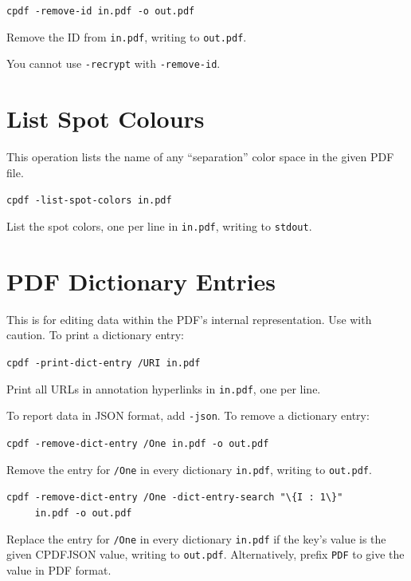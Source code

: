 \documentclass{book}
\begin{document}
  \begin{framed}
  \small\noindent\verb!cpdf -remove-id in.pdf -o out.pdf!

  \vspace{2.5mm}
  \noindent Remove the ID from \texttt{in.pdf}, writing to \texttt{out.pdf}.
  \end{framed}

\noindent You cannot use \texttt{-recrypt} with \texttt{-remove-id}.

\section{List Spot Colours}
This operation lists the name of any ``separation'' color space in the given PDF file.

  \begin{framed}
  \small\noindent\verb!cpdf -list-spot-colors in.pdf!

  \vspace{2.5mm}
  \noindent List the spot colors, one per line in \texttt{in.pdf}, writing to \texttt{stdout}.
  \end{framed}

\section{PDF Dictionary Entries}
\label{removedictentry}
This is for editing data within the PDF's internal representation. Use with caution.
To print a dictionary entry:

  \begin{framed}
  \small\noindent\verb!cpdf -print-dict-entry /URI in.pdf!

  \vspace{2.5mm}
  \noindent Print all URLs in annotation hyperlinks in \texttt{in.pdf}, one per line. 
  \end{framed}

\noindent To report data in JSON format, add \texttt{-json}. To remove a dictionary entry:

  \begin{framed}
  \small\noindent\verb!cpdf -remove-dict-entry /One in.pdf -o out.pdf!

  \vspace{2.5mm}
  \noindent Remove the entry for \texttt{/One} in every dictionary \texttt{in.pdf}, writing to \texttt{out.pdf}. 

  \vspace{2.5mm}

  \small\noindent\verb!cpdf -remove-dict-entry /One -dict-entry-search "\{I : 1\}"!\\
  \small\noindent\verb!     in.pdf -o out.pdf!

  \vspace{2.5mm}
  \noindent Replace the entry for \texttt{/One} in every dictionary \texttt{in.pdf} if the key's value is the given CPDFJSON value, writing to \texttt{out.pdf}. Alternatively, prefix \texttt{PDF} to give the value in PDF format.
  \end{framed}
\end{document}
